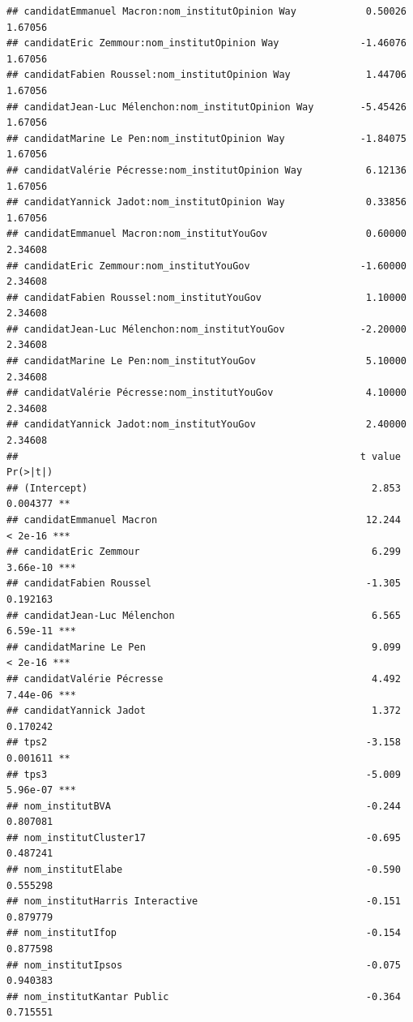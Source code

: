\documentclass[
]{book}
\begin{document}
\begin{verbatim}
## candidatEmmanuel Macron:nom_institutOpinion Way            0.50026    1.67056
## candidatEric Zemmour:nom_institutOpinion Way              -1.46076    1.67056
## candidatFabien Roussel:nom_institutOpinion Way             1.44706    1.67056
## candidatJean-Luc Mélenchon:nom_institutOpinion Way        -5.45426    1.67056
## candidatMarine Le Pen:nom_institutOpinion Way             -1.84075    1.67056
## candidatValérie Pécresse:nom_institutOpinion Way           6.12136    1.67056
## candidatYannick Jadot:nom_institutOpinion Way              0.33856    1.67056
## candidatEmmanuel Macron:nom_institutYouGov                 0.60000    2.34608
## candidatEric Zemmour:nom_institutYouGov                   -1.60000    2.34608
## candidatFabien Roussel:nom_institutYouGov                  1.10000    2.34608
## candidatJean-Luc Mélenchon:nom_institutYouGov             -2.20000    2.34608
## candidatMarine Le Pen:nom_institutYouGov                   5.10000    2.34608
## candidatValérie Pécresse:nom_institutYouGov                4.10000    2.34608
## candidatYannick Jadot:nom_institutYouGov                   2.40000    2.34608
##                                                           t value Pr(>|t|)    
## (Intercept)                                                 2.853 0.004377 ** 
## candidatEmmanuel Macron                                    12.244  < 2e-16 ***
## candidatEric Zemmour                                        6.299 3.66e-10 ***
## candidatFabien Roussel                                     -1.305 0.192163    
## candidatJean-Luc Mélenchon                                  6.565 6.59e-11 ***
## candidatMarine Le Pen                                       9.099  < 2e-16 ***
## candidatValérie Pécresse                                    4.492 7.44e-06 ***
## candidatYannick Jadot                                       1.372 0.170242    
## tps2                                                       -3.158 0.001611 ** 
## tps3                                                       -5.009 5.96e-07 ***
## nom_institutBVA                                            -0.244 0.807081    
## nom_institutCluster17                                      -0.695 0.487241    
## nom_institutElabe                                          -0.590 0.555298    
## nom_institutHarris Interactive                             -0.151 0.879779    
## nom_institutIfop                                           -0.154 0.877598    
## nom_institutIpsos                                          -0.075 0.940383    
## nom_institutKantar Public                                  -0.364 0.715551    

\end{verbatim}
\end{document}
